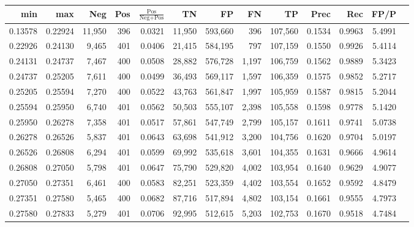 \begin{tabular}{rrrrrrrrrrrrr}
\toprule
    min &     max &    Neg & Pos & $\frac{\text{Pos}}{\text{Neg}+\text{Pos}}$ &      TN &      FP &      FN &      TP &   Prec &    Rec &   FP/P \\
\midrule
0.13578 & 0.22924 & 11,950 & 396 &                                     0.0321 &  11,950 & 593,660 &     396 & 107,560 & 0.1534 & 0.9963 & 5.4991 \\
0.22926 & 0.24130 &  9,465 & 401 &                                     0.0406 &  21,415 & 584,195 &     797 & 107,159 & 0.1550 & 0.9926 & 5.4114 \\
0.24131 & 0.24737 &  7,467 & 400 &                                     0.0508 &  28,882 & 576,728 &   1,197 & 106,759 & 0.1562 & 0.9889 & 5.3423 \\
0.24737 & 0.25205 &  7,611 & 400 &                                     0.0499 &  36,493 & 569,117 &   1,597 & 106,359 & 0.1575 & 0.9852 & 5.2717 \\
0.25205 & 0.25594 &  7,270 & 400 &                                     0.0522 &  43,763 & 561,847 &   1,997 & 105,959 & 0.1587 & 0.9815 & 5.2044 \\
0.25594 & 0.25950 &  6,740 & 401 &                                     0.0562 &  50,503 & 555,107 &   2,398 & 105,558 & 0.1598 & 0.9778 & 5.1420 \\
0.25950 & 0.26278 &  7,358 & 401 &                                     0.0517 &  57,861 & 547,749 &   2,799 & 105,157 & 0.1611 & 0.9741 & 5.0738 \\
0.26278 & 0.26526 &  5,837 & 401 &                                     0.0643 &  63,698 & 541,912 &   3,200 & 104,756 & 0.1620 & 0.9704 & 5.0197 \\
0.26526 & 0.26808 &  6,294 & 401 &                                     0.0599 &  69,992 & 535,618 &   3,601 & 104,355 & 0.1631 & 0.9666 & 4.9614 \\
0.26808 & 0.27050 &  5,798 & 401 &                                     0.0647 &  75,790 & 529,820 &   4,002 & 103,954 & 0.1640 & 0.9629 & 4.9077 \\
0.27050 & 0.27351 &  6,461 & 400 &                                     0.0583 &  82,251 & 523,359 &   4,402 & 103,554 & 0.1652 & 0.9592 & 4.8479 \\
0.27351 & 0.27580 &  5,465 & 400 &                                     0.0682 &  87,716 & 517,894 &   4,802 & 103,154 & 0.1661 & 0.9555 & 4.7973 \\
0.27580 & 0.27833 &  5,279 & 401 &                                     0.0706 &  92,995 & 512,615 &   5,203 & 102,753 & 0.1670 & 0.9518 & 4.7484 \\

\end{tabular}
